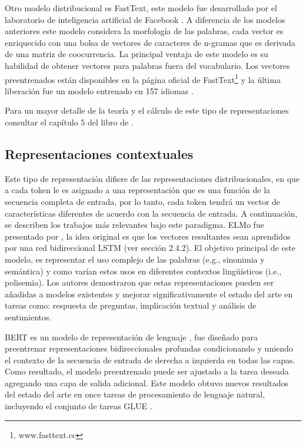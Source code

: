 Otro modelo distribucional es FastText, este modelo fue desarrollado por el laboratorio de inteligencia artificial de Facebook \citep{mikolov2017advances}. A diferencia de los modelos anteriores este modelo considera la morfología de las palabras, cada vector es enriquecido con una bolsa de vectores de caracteres de n-gramas que es derivada de una matriz de coocurrencia. La principal ventaja de este modelo es su habilidad de obtener vectores para palabras fuera del vocabulario. Los vectores preentrenados están disponibles en la página oficial de FastText\footnote{www.fasttext.cc}  y la última liberación fue un modelo entrenado en 157 idiomas \citep{grave2018learning}.

Para un mayor detalle de la teoría y el cálculo de este tipo de representaciones consultar el capítulo 5 del libro de \citep{kamath2019deep}.

\subsection{Representaciones contextuales}

Este tipo de representación difiere de las representaciones distribucionales, en que a cada token le es asignado a una representación que es una función de la secuencia completa de entrada, por lo tanto, cada token tendrá un vector de características diferentes de acuerdo con la secuencia de entrada. A continuación, se describen los trabajos más relevantes bajo este paradigma. 
ELMo fue presentado por \citep{peters2018deep}, la idea original es que los vectores resultantes sean aprendidos por una red bidireccional LSTM (ver sección 2.4.2). El objetivo principal de este modelo, es representar el uso complejo de las palabras (e.g., sinonimia y semántica) y como varían estos usos en diferentes contextos lingüísticos (i.e., polisemia). Los autores demostraron que estas representaciones pueden ser añadidas a modelos existentes y mejorar significativamente el estado del arte en tareas como: respuesta de preguntas, implicación textual y análisis de sentimientos.

BERT es un modelo de representación de lenguaje \cite{devlin2018bert}, fue diseñado para preentrenar representaciones bidireccionales profundas condicionando y uniendo el contexto de la secuencia de entrada de derecha a izquierda en todas las capas. Como resultado, el modelo preentrenado puede ser ajustado a la tarea deseada agregando una capa de salida adicional. Este modelo obtuvo nuevos resultados del estado del arte en once tareas de procesamiento de lenguaje natural, incluyendo el conjunto de tareas GLUE \cite{wang2018glue}.